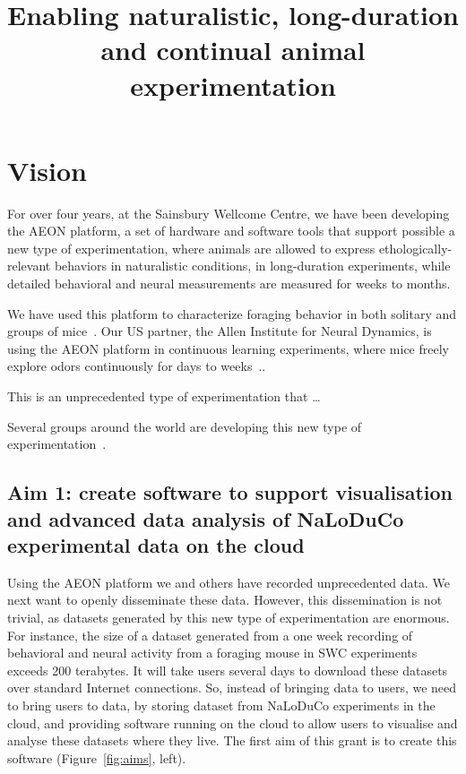\documentclass[12pt]{article}
\title{Enabling naturalistic, long-duration and continual animal experimentation}
\begin{document}
\maketitle

\section{Vision}

For over four years, at the Sainsbury Wellcome Centre, we have been developing
the AEON platform, a set of hardware and software tools that support possible a
new type of experimentation, where animals are allowed to express
ethologically-relevant behaviors in naturalistic conditions, in long-duration
experiments, while detailed behavioral and neural measurements are measured for
weeks to months.

We have used this platform to characterize foraging behavior in both solitary
and groups of mice~\cite{aeonRepo}.
%
Our US partner, the Allen Institute for Neural Dynamics, is using the AEON
platform in continuous learning experiments, where mice freely explore odors
continuously for days to weeks~\cite{carlsPapers}..

This is an unprecedented type of experimentation that \ldots

Several groups around the world are developing this new type of
experimentation~\cite{}.

\subsection{Aim 1: create software to support visualisation and advanced data
analysis of NaLoDuCo experimental data on the cloud}

Using the AEON platform we and others have recorded unprecedented data. We next
want to openly disseminate these data. However, this dissemination is not
trivial, as datasets generated by this new type of experimentation are
enormous. For instance, the size of a dataset generated from a one week
recording of behavioral and neural activity from a foraging mouse in SWC
experiments exceeds 200 terabytes. It will take users several days to download
these datasets over standard Internet connections.
%
So, instead of bringing data to users, we need to bring users to data, by
storing dataset from NaLoDuCo experiments in the cloud, and providing software
running on the cloud to allow users to visualise and analyse these datasets
where they live.
%
The first aim of this grant is to create this software (Figure~\ref{fig:aims},
left).
\end{document}
